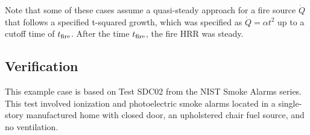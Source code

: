 Note that some of these cases assume a quasi-steady approach for a fire source $\dot Q$ that follows a specified t-squared growth, which was specified as $\dot Q = \alpha t^2$ up to a cutoff time of $t\sb{fire}$. After the time $t\sb{fire}$, the fire HRR was steady.


\clearpage


\subsection*{Verification}

This example case is based on Test SDC02 from the NIST Smoke Alarms series. This test involved ionization and photoelectric smoke alarms located in a single-story manufactured home with closed door, an upholstered chair fuel source, and no ventilation.

